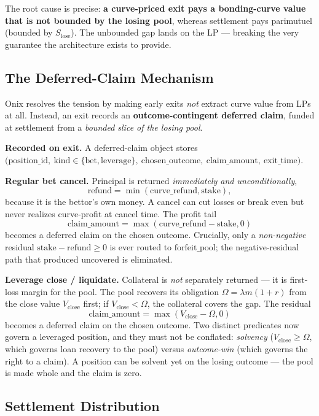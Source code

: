 \documentclass{ledger}
\theoremstyle{plain}
\theoremstyle{remark}
\begin{document}
The root cause is precise: \textbf{a curve-priced exit pays a bonding-curve value
that is not bounded by the losing pool}, whereas settlement pays parimutuel
(bounded by $S_{\text{lose}}$). The unbounded gap lands on the LP --- breaking
the very guarantee the architecture exists to provide.

\subsection{The Deferred-Claim Mechanism}\label{sec:defclaim}

Onix resolves the tension by making early exits \emph{not} extract curve value
from LPs at all. Instead, an exit records an \textbf{outcome-contingent deferred
claim}, funded at settlement from a \emph{bounded slice of the losing pool}.

\textbf{Recorded on exit.} A deferred-claim object stores
$\big(\text{position\_id},\ \text{kind} \in \{\text{bet}, \text{leverage}\},\
\text{chosen\_outcome},\ \text{claim\_amount},\ \text{exit\_time}\big)$.

\textbf{Regular bet cancel.} Principal is returned \emph{immediately and
unconditionally},
\[
\text{refund} = \min(\text{curve\_refund}, \text{stake}),
\]
because it is the bettor's own money. A cancel can cut losses or break even but
never realizes curve-profit at cancel time. The profit tail
\[
\text{claim\_amount} = \max(\text{curve\_refund} - \text{stake}, 0)
\]
becomes a deferred claim on the chosen outcome. Crucially, only a
\emph{non-negative} residual $\text{stake} - \text{refund} \ge 0$ is ever routed
to $\text{forfeit\_pool}$; the negative-residual path that produced
$\text{uncovered}$ is eliminated.

\textbf{Leverage close / liquidate.} Collateral is \emph{not} separately
returned --- it is first-loss margin for the pool. The pool recovers its
obligation $\Omega = \lambda m (1 + r)$ from the close value $V_{\text{close}}$
first; if $V_{\text{close}} < \Omega$, the collateral covers the gap. The
residual
\[
\text{claim\_amount} = \max(V_{\text{close}} - \Omega, 0)
\]
becomes a deferred claim on the chosen outcome. Two distinct predicates now
govern a leveraged position, and they must not be conflated: \emph{solvency}
($V_{\text{close}} \ge \Omega$, which governs loan recovery to the pool) versus
\emph{outcome-win} (which governs the right to a claim). A position can be solvent
yet on the losing outcome --- the pool is made whole and the claim is zero.

\subsection{Settlement Distribution}\label{sec:defsettle}
\end{document}
